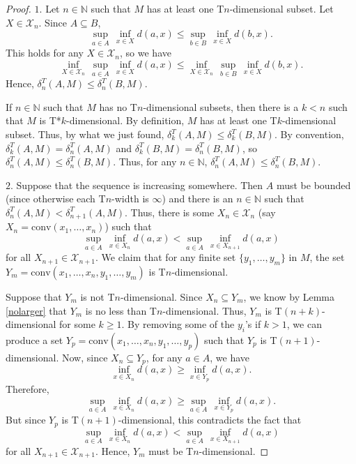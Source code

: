 \documentclass{bcp92}
\theoremstyle{plain}
\theoremstyle{definition}
\begin{document}
\begin{proof}
$1.$ Let $n \in \mathbb{N}$ such that $M$ has at least one T$n$-dimensional
subset. Let $X \in \mathcal{X}_n$. Since $A \subseteq B$,
$$
\sup_{a \in A}\, \inf_{x \in X} d(a,x) \leq \sup_{b \in B}\, \inf_{x \in X}
d(b,x).
$$
This holds for any $X \in \mathcal{X}_n$, so we have
$$
\inf_{X \in \mathcal{X}_n}\, \sup_{a \in A} \,\inf_{x \in X} d(a,x) \leq
\inf_{X \in \mathcal{X}_n}\, \sup_{b \in B} \,\inf_{x \in X} d(b,x).
$$
Hence, $\delta_n^T(A,M) \leq \delta_n^T(B,M)$.

If $n \in \mathbb{N}$ such that $M$ has no T$n$-dimensional subsets, then
there is a $k < n$ such that $M$ is T*$k$-dimensional. By definition, $M$ has
at least one T$k$-dimensional subset. Thus, by what we just found,
$\delta_k^T(A,M) \leq \delta_k^T(B,M)$. By convention, $\delta_k^T(A,M) =
\delta_n^T(A,M)$ and $\delta_k^T(B,M) = \delta_n^T(B,M)$, so $\delta_n^T(A,M)
\leq \delta_n^T(B,M)$. Thus, for any $n \in \mathbb{N}$, $\delta_n^T(A,M)
\leq \delta_n^T(B,M)$.

\vsks

$2.$ Suppose that the sequence is increasing somewhere. Then $A$ must be
bounded (since otherwise each T$n$-width is $\infty$) and there is an $n \in
\mathbb{N}$ such that $\delta_n^T(A,M) <  \delta_{n+1}^T(A,M)$. Thus, there
is some $X_n \in \mathcal{X}_n$ (say $X_n = \text{conv}(x_1, \dots, x_{n})$)
such that
$$
\sup_{a \in A} \,\inf_{x \in X_n} d(a,x) <
\sup_{a \in A} \,\inf_{x \in X_{n+1}} d(a,x)
$$
for all $X_{n+1} \in \mathcal{X}_{n+1}$. We claim that for any finite set $\{
y_1, \dots, y_m \}$ in $M$, the set $Y_m = \text{conv}(x_1, \dots, x_{n},
y_1, \dots, y_m)$ is T$n$-dimensional.

Suppose that $Y_m$ is not T$n$-dimensional. Since $X_n \subseteq Y_m$, we
know by Lemma \ref{nolarger} that $Y_m$ is no less than T$n$-dimensional.
Thus, $Y_m$ is T$(n+k)$-dimensional for some $k \geq 1$. By removing some of
the $y_i$'s if $k > 1$, we can produce a set $Y_p = \text{conv}(x_1, \dots,
x_{n}, y_1, \dots, y_p)$ such that $Y_p$ is T$(n+1)$-dimensional. Now, since
$X_n \subseteq Y_p$, for any $a \in A$, we have
$$
\inf_{x \in X_n} d(a,x) \geq \inf_{x \in Y_p} d(a,x).
$$
Therefore,
$$
\sup_{a \in A} \,\inf_{x \in X_n} d(a,x) \geq
\sup_{a \in A} \,\inf_{x \in Y_p} d(a,x).
$$
But since $Y_p$ is T$(n+1)$-dimensional, this contradicts the fact that
$$
\sup_{a \in A} \,\inf_{x \in X_n} d(a,x) <
\sup_{a \in A} \,\inf_{x \in X_{n+1}} d(a,x)
$$
for all $X_{n+1} \in \mathcal{X}_{n+1}$. Hence, $Y_m$ must be T$n$-dimensional.


\end{proof}
\end{document}
